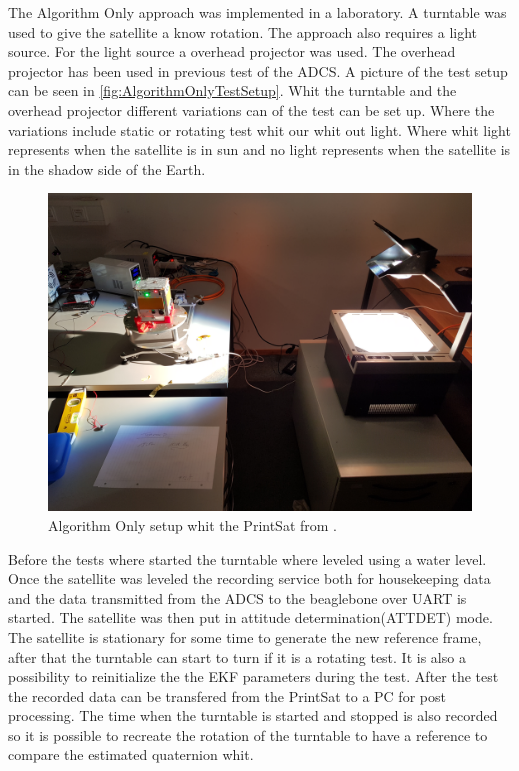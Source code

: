 The Algorithm Only approach was implemented in a laboratory. A turntable was used to give the satellite a know rotation. The approach also requires a light source. For the light source a overhead projector was used. The overhead projector has been used in previous test of the ADCS. A picture of the test setup can be seen in \autoref{fig:AlgorithmOnlyTestSetup}. Whit the turntable and the overhead projector different variations can of the test can be set up. Where the variations include static or rotating test whit our whit out light. Where whit light represents when the satellite is in sun and no light represents when the satellite is in the shadow side of the Earth. 

\begin{figure}[tbp]
	\centering
	\includegraphics[width=0.5\columnwidth]{./Pictures/Indoor}
	\caption{Algorithm Only setup whit the PrintSat from \cite{DavidThesis}.}
	\label{fig:AlgorithmOnlyTestSetup}
\end{figure} 

Before the tests where started the turntable where leveled using a water level. Once the satellite was leveled the recording service both for housekeeping data and the data transmitted from the ADCS to the beaglebone over UART is started. The satellite was then put in attitude determination(ATTDET) mode. The satellite is stationary for some time to generate the new reference frame, after that the turntable can start to turn if it is a rotating test. It is also a possibility to reinitialize the the EKF parameters during the test. After the test the recorded data can be transfered from the PrintSat to a PC for post processing. The time when the turntable is started and stopped is also recorded so it is possible to recreate the rotation of the turntable to have a reference to compare the estimated quaternion whit. 

